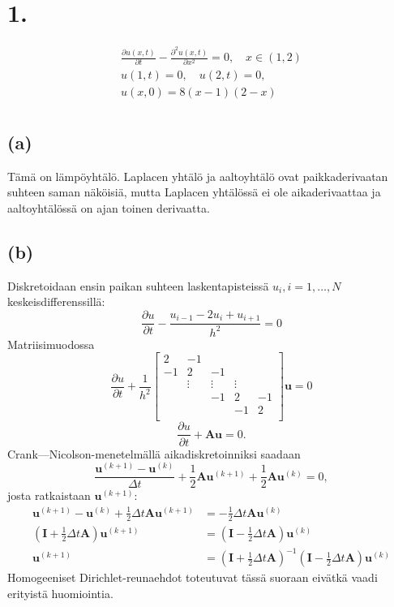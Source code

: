 \documentclass{article}
\title{}
\author{Mikael Myyrä}
\date{}
\begin{document}
\section*{1.}

\begin{gather*}
  \frac{\partial u(x,t)}{\partial t} - \frac{\partial^2 u(x,t)}{\partial x^2} = 0, \quad x \in (1, 2) \\
  u(1,t) = 0, \quad u(2,t) = 0, \\
  u(x,0) = 8(x-1)(2-x) \\
\end{gather*}

\subsection*{(a)}

Tämä on lämpöyhtälö. Laplacen yhtälö ja aaltoyhtälö ovat paikkaderivaatan
suhteen saman näköisiä, mutta Laplacen yhtälössä ei ole aikaderivaattaa ja
aaltoyhtälössä on ajan toinen derivaatta.

\subsection*{(b)}

Diskretoidaan ensin paikan suhteen laskentapisteissä $u_i, i = 1,\dots,N$
keskeisdifferenssillä:
\[
  \frac{\partial u}{\partial t} - \frac{u_{i-1} - 2u_i + u_{i+1}}{h^2} = 0
\]
Matriisimuodossa
\[
  \frac{\partial u}{\partial t} + \frac{1}{h^2}
  \begin{bmatrix}
    2 & -1 \\
    -1 & 2 & -1 \\
       & \vdots & \vdots & \vdots \\
       & & -1 & 2 & -1 \\
       & & & -1 & 2 \\
  \end{bmatrix}
  \mathbf{u} = 0
\]
\[
  \frac{\partial u}{\partial t} + \mathbf{A}\mathbf{u} = 0.
\]
Crank—Nicolson-menetelmällä aikadiskretoinniksi saadaan
\[
  \frac{\mathbf{u}^{(k+1)} - \mathbf{u}^{(k)}}{\Delta t}
  + \frac{1}{2}\mathbf{A}\mathbf{u}^{(k+1)}
  + \frac{1}{2}\mathbf{A}\mathbf{u}^{(k)} = 0,
\]
josta ratkaistaan $\mathbf{u}^{(k+1)}$:
\begin{align*}
  \mathbf{u}^{(k+1)} - \mathbf{u}^{(k)}
  + \frac{1}{2}\Delta t \mathbf{A}\mathbf{u}^{(k+1)}
  &= -\frac{1}{2}\Delta t \mathbf{A}\mathbf{u}^{(k)} \\
  (\mathbf{I} + \frac{1}{2}\Delta t \mathbf{A})\mathbf{u}^{(k+1)}
  &= (\mathbf{I} - \frac{1}{2}\Delta t \mathbf{A})\mathbf{u}^{(k)} \\
  \mathbf{u}^{(k+1)} &= (\mathbf{I} + \frac{1}{2}\Delta t \mathbf{A})^{-1}
  (\mathbf{I} - \frac{1}{2}\Delta t \mathbf{A})\mathbf{u}^{(k)}
\end{align*}
Homogeeniset Dirichlet-reunaehdot toteutuvat tässä suoraan eivätkä vaadi
erityistä huomiointia.
\end{document}
